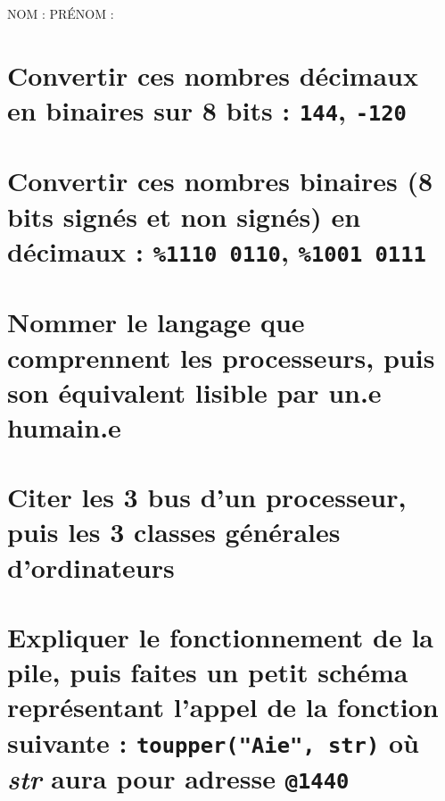 \documentclass[11pt,a4paper]{article}
\author{Fabrice BOISSIER}
\begin{document}
\setlength{\fboxrule}{2pt}

\noindent {}

\bigskip

NOM : \hspace{6.5cm} PR\'ENOM :

\smallskip

\section{Convertir ces nombres décimaux en binaires sur 8 bits : \texttt{144}, \texttt{-120}}

\bigskip
\bigskip
\bigskip

\section{Convertir ces nombres binaires (8 bits signés et non signés) en décimaux : \texttt{\%1110 0110}, \texttt{\%1001 0111}}

\bigskip
\bigskip
\bigskip

\section{Nommer le langage que comprennent les processeurs, puis son équivalent lisible par un.e humain.e}

\bigskip
\bigskip
\bigskip

\section{Citer les 3 bus d'un processeur, puis les 3 classes générales d'ordinateurs}

\bigskip
\bigskip
\bigskip
\bigskip
\bigskip

\section{Expliquer le fonctionnement de la pile, puis faites un petit schéma représentant l'appel de la fonction suivante : \texttt{toupper("Aie", str)} où \textit{str} aura pour adresse \texttt{@1440}}
\end{document}
